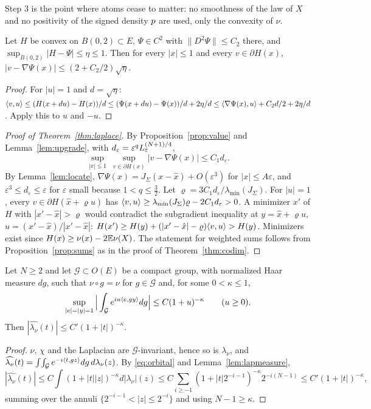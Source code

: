 Step 3 is the point where atoms cease to matter: no smoothness of the law of $X$ and no positivity of the signed
density $p$ are used, only the convexity of $\nu$.

\begin{lemma}\label{lem:upgrade}
Let $H$ be convex on $B(0,2)\subset E$, $\Psi\in C^2$ with $\|D^2\Psi\|\le C_2$ there, and
$\sup_{B(0,2)}|H-\Psi|\le\eta\le1$. Then for every $|x|\le1$ and every $v\in\partial H(x)$,
$|v-\nabla\Psi(x)|\le(2+C_2/2)\sqrt\eta$.
\end{lemma}
\begin{proof}
For $|u|=1$ and $d=\sqrt\eta$: $\langle v, u\rangle\le(H(x+du)-H(x))/d\le(\Psi(x+du)-\Psi(x))/d+2\eta/d\le
\langle \nabla\Psi(x), u\rangle+C_2d/2+2\eta/d$. Apply this to $u$ and $-u$.
\end{proof}

\begin{proof}[Proof of Theorem~\ref{thm:laplace}]
By Proposition~\ref{prop:value} and Lemma~\ref{lem:upgrade}, with $d_\varepsilon=\varepsilon^qL_\varepsilon^{(N+1)/4}$,
\begin{equation}\label{eq:allsub}
\sup_{|x|\le1}\ \sup_{v\in\partial H(x)}|v-\nabla\Psi(x)|\le C_1d_\varepsilon .
\end{equation}
By Lemma~\ref{lem:locate}, $\nabla\Psi(x)=J_\Sigma(x-\hat x)+O(\varepsilon^3)$ for $|x|\le A\varepsilon$, and
$\varepsilon^3\le d_\varepsilon\le\varepsilon$ for $\varepsilon$ small because $1<q\le\frac32$. Let
$\varrho=3C_1d_\varepsilon/\lambda_{\min}(J_\Sigma)$. For $|u|=1$, every $v\in\partial H(\hat x+\varrho u)$ has
$\langle v, u\rangle\ge\lambda_{\min}(J_\Sigma)\varrho-2C_1d_\varepsilon>0$. A minimizer $x'$ of $H$ with $|x'-\hat x|>\varrho$ would
contradict the subgradient inequality at $y=\hat x+\varrho u$, $u=(x'-\hat x)/|x'-\hat x|$:
$H(x')\ge H(y)+(|x'-\hat x|-\varrho)\langle v, u\rangle>H(y)$. Minimizers exist since $H(x)\ge\nu(x)-2\mathbb{E}\nu(X)$. The statement for
weighted sums follows from Proposition~\ref{prop:sums} as in the proof of Theorem~\ref{thm:codim}.
\end{proof}

\begin{lemma}\label{lem:orbit}
Let $N\ge2$ and let $\mathcal G\subset O(E)$ be a compact group, with normalized Haar measure $dg$, such that $\nu\circ g=\nu$
for $g\in\mathcal G$ and, for some $0<\kappa\le1$,
\begin{equation}\label{eq:orbital}
\sup_{|e|=|y|=1}\Big|\int_{\mathcal G}e^{iu\langle e, gy\rangle}dg\Big|\le C(1+u)^{-\kappa}\qquad(u\ge0).
\end{equation}
Then $|\widehat{\lambda_\nu}(t)|\le C'(1+|t|)^{-\kappa}$.
\end{lemma}
\begin{proof}
$\nu$, $\chi$ and the Laplacian are $\mathcal G$-invariant, hence so is $\lambda_\nu$, and
$\widehat{\lambda_\nu}(t)=\int\!\int_{\mathcal G}e^{-i\langle t, gz\rangle}dg\,d\lambda_\nu(z)$. By \eqref{eq:orbital} and
Lemma~\ref{lem:lapmeasure},
\[
|\widehat{\lambda_\nu}(t)|\le C\int(1+|t||z|)^{-\kappa}d|\lambda_\nu|(z)\le C\sum_{i\ge-1}(1+|t|2^{-i-1})^{-\kappa}2^{-i(N-1)}
\le C'(1+|t|)^{-\kappa},
\]
summing over the annuli $\{2^{-i-1}<|z|\le2^{-i}\}$ and using $N-1\ge\kappa$.
\end{proof}

